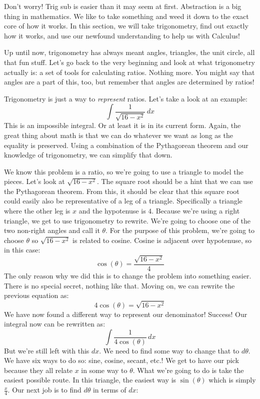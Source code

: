 \documentclass[../revisedmain.tex]{subfiles}
\begin{document}
	Don't worry! Trig sub is easier than it may seem at first. Abstraction is a big thing in mathematics. We like to take something and weed it down to the exact core of how it works. In this section, we will take trigonometry, find out exactly how it works, and use our newfound understanding to help us with Calculus!\\\newline\par Up until now, trigonometry has always meant angles, triangles, the unit circle, all that fun stuff. Let's go back to the very beginning and look at what trigonometry actually is: a set of tools for calculating ratios. Nothing more. You might say that angles are a part of this, too, but remember that angles are determined by ratios!\\\newline\par Trigonometry is just a way to \textit{represent} ratios. Let's take a look at an example: \[\int\frac{1}{\sqrt{16-x^2}}\,dx\] This is an impossible integral. Or at least it is in its current form. Again, the great thing about math is that we can do whatever we want as long as the equality is preserved. Using a combination of the Pythagorean theorem and our knowledge of trigonometry, we can simplify that down.\\\newline\par We know this problem is a ratio, so we're going to use a triangle to model the pieces. Let's look at $\sqrt{16-x^2}$. The square root should be a hint that we can use the Pythagorean theorem. From this, it should be clear that this square root could easily also be representative of a leg of a triangle. Specifically a triangle where the other leg is $x$ and the hypotenuse is $4$. Because we're using a right triangle, we get to use trigonometry to rewrite. We're going to choose one of the two non-right angles and call it $\theta$. For the purpose of this problem, we're going to choose $\theta$ so $\sqrt{16-x^2}$ is related to cosine. Cosine is adjacent over hypotenuse, so in this case: \[\cos(\theta)=\frac{\sqrt{16-x^2}}{4}\]The only reason why we did this is to change the problem into something easier. There is no special secret, nothing like that. Moving on, we can rewrite the previous equation as:\[4\cos(\theta)=\sqrt{16-x^2}\]We have now found a different way to represent our denominator! Success! Our integral now can be rewritten as: \[\int\frac{1}{4\cos(\theta)}\,dx\] But we're still left with this $dx$. We need to find some way to change that to $d\theta$. We have six ways to do so: sine, cosine, secant, etc.! We get to have our pick because they all relate $x$ in some way to $\theta$. What we're going to do is take the easiest possible route. In this triangle, the easiest way is $\sin(\theta)$ which is simply $\displaystyle\frac{x}{4}$. Our next job is to find $d\theta$ in terms of $dx$: 
\end{document}
